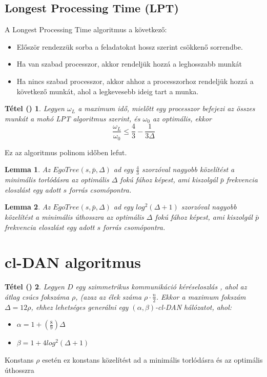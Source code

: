 \documentclass[12pt]{report}
\newtheorem{mytetel}{Tétel (\cite{avin_demand-aware_nodate})}
\newtheorem{mylemma}{Lemma}
\begin{document}
\subsection{Longest Processing Time (LPT)}

A Longest Processing Time algoritmus a következő:

\begin{itemize}
	\item Először rendezzük sorba a feladatokat hossz szerint csökkenő sorrendbe.
	\item Ha van szabad processzor, akkor rendeljük hozzá a leghosszabb munkát
	\item Ha nincs szabad processzor, akkor ahhoz a processzorhoz rendeljük hozzá a következő munkát, ahol a legkevesebb ideig tart a munka.
\end{itemize}

\begin{mytetel}
	Legyen \(\omega_L\) a maximum idő, mielőtt egy processzor befejezi az összes munkát a mohó LPT algoritmus szerint, és \(\omega_0\) az optimális, ekkor \[\frac{\omega_L}{\omega_0} \le \frac{4}{3} - \frac{1}{3\Delta}\]
\end{mytetel}

Ez az algoritmus polinom időben lefut.

\begin{mylemma}
	Az \(EgoTree(s, \bar{p}, \Delta)\) ad egy \(\frac{4}{3}\) szorzóval nagyobb közelítést a minimális torlódásra az optimális \(\Delta\) fokú fához képest, ami kiszolgál \(\bar{p}\) frekvencia eloszlást egy adott \(s\) forrás csomópontra.
\end{mylemma}

\begin{mylemma}
	Az \(EgoTree(s, \bar{p}, \Delta)\) ad egy \(log^2(\Delta + 1)\) szorzóval nagyobb közelítést a minimális úthosszra az optimális \(\Delta\) fokú fához képest, ami kiszolgál \(\bar{p}\) frekvencia eloszlást egy adott \(s\) forrás csomópontra.
\end{mylemma}

\section{cl-DAN algoritmus}

\begin{mytetel}
	Legyen \(D\) egy szimmetrikus kommunikáció kéréseloszlás , ahol az átlag csúcs fokszáma \(\rho\), (azaz az élek száma \(\rho \cdot \frac{n}{2}\). Ekkor a maximum fokszám \(\Delta = 12\rho\), ehhez lehetséges generálni egy \((\alpha, \beta)\)-cl-DAN hálózatot, ahol:
	\begin{itemize}
		\item \(\alpha = 1 + (\frac{8}{9})\Delta\)
		\item \(\beta = 1 + 4log^2(\Delta + 1)\)
	\end{itemize}
\end{mytetel}
Konstans \(\rho\) esetén ez konstans közelítést ad a minimális torlódásra és az optimális úthosszra
\end{document}
